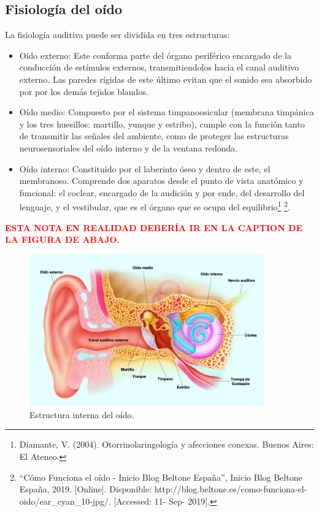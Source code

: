 \documentclass[a4paper]{article}
\begin{document}
\subsection{Fisiología del oído}

La fisiología auditiva puede ser dividida en tres estructuras:
\begin{itemize}
	\item Oído externo:
	Este conforma parte del órgano periférico encargado de la conducción de estímulos externos, transmitiendolos hacia el canal auditivo externo. Las paredes rígidas de este último evitan que el sonido sea absorbido por por los demás tejidos blandos.
	\item Oído medio:
	Compuesto por el sistema timpanoosicular (membrana timpánica y los tres huesillos: martillo, yunque y estribo), cumple con la función tanto de transmitir las señales del ambiente, como de proteger las estructuras neurosensoriales del oído interno y de la ventana redonda.
	\item Oído interno:
	Constituido por el laberinto óseo y dentro de este, el membranoso. Comprende dos aparatos desde el punto de vista anatómico y funcional: el coclear, encargado de la audición y por ende, del desarrollo del lenguaje, y el vestibular, que es el órgano que se ocupa del equilibrio\footnote{Diamante, V. (2004). Otorrinolaringología y afecciones conexas. Buenos Aires: El Ateneo.} \footnote{``Cómo Funciona el oído - Inicio Blog Beltone España'', Inicio Blog Beltone España, 2019. [Online]. Disponible: http://blog.beltone.es/como-funciona-el-oido/ear\_cyan\_10-jpg/. [Accessed: 11- Sep- 2019].}.
\end{itemize}

\begin{center}
\textcolor{red}{\textbf{ESTA NOTA EN REALIDAD DEBERÍA IR EN LA CAPTION DE LA FIGURA DE ABAJO.}}
\end{center}

\begin{figure}[H]
\centering
	\includegraphics[width=0.9\textwidth]{Imagenes/Partes-del-oido.png}
	\caption{Estructura interna del oído.}
	\label{fig:oido}
\end{figure}
\end{document}

